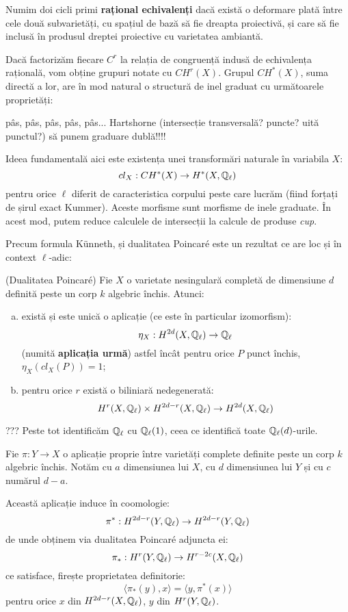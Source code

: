 \documentclass[13pt,openany]{book}
\begin{document}
Numim doi cicli primi {\bf rațional echivalenți} dacă există o deformare plată între cele două subvarietăți, cu spațiul de bază să fie dreapta proiectivă, și care să fie inclusă în produsul dreptei proiective cu varietatea ambiantă.

Dacă factorizăm fiecare $C^r$ la relația de congruență indusă de echivalența rațională, vom obține grupuri notate cu $CH^r(X)$. Grupul $CH^*(X)$, suma directă a lor, are în mod natural o structură de inel graduat cu următoarele proprietăți:

pâs, pâs, pâs, pâs, pâs... Hartshorne (intersecție transversală? puncte? uită punctul?) să punem graduare dublă!!!!

Ideea fundamentală aici este existența unei transformări naturale în variabila $X$:
$$cl_X : CH^*(X) \rightarrow H^*(X,\mathbb{Q}_\ell)$$
pentru orice $\ell$ diferit de caracteristica corpului peste care lucrăm (fiind forțați de șirul exact Kummer). Aceste morfisme sunt morfisme de inele graduate. În acest mod, putem reduce calculele de intersecții la calcule de produse {\it cup}.

Precum formula Künneth, și dualitatea Poincaré este un rezultat ce are loc și în context $\ell$-adic:

\begin{teo}
(Dualitatea Poincaré) Fie $X$ o varietate nesingulară completă de dimensiune $d$ definită peste un corp $k$ algebric închis. Atunci:
\begin{enumerate}[a)]
\item există și este unică o aplicație (ce este în particular izomorfism):
$$\eta_X : H^{2d}(X,\mathbb{Q}_\ell) \rightarrow \mathbb{Q}_\ell$$
(numită {\bf aplicația urmă}) astfel încât pentru orice $P$ punct închis, $\eta_X(cl_X(P))=1$;
\item pentru orice $r$ există o biliniară nedegenerată:
$$H^r(X,\mathbb{Q}_\ell) \times H^{2d-r}(X,\mathbb{Q}_\ell) \rightarrow H^{2d}(X,\mathbb{Q}_\ell)$$
\end{enumerate}
\end{teo}

??? Peste tot identificăm $\mathbb{Q}_\ell$ cu $\mathbb{Q}_\ell(1)$, ceea ce identifică toate $\mathbb{Q}_\ell(d)$-urile.

Fie $\pi : Y \rightarrow X$ o aplicație proprie între varietăți complete definite peste un corp $k$ algebric închis. Notăm cu $a$ dimensiunea lui $X$, cu $d$ dimensiunea lui $Y$ și cu $c$ numărul $d-a$.

Această aplicație induce în coomologie:
$$\pi^*: H^{2d-r}(Y,\mathbb{Q}_\ell) \rightarrow H^{2d-r}(Y,\mathbb{Q}_\ell)$$
de unde obținem via dualitatea Poincaré adjuncta ei:
$$\pi_* : H^r(Y,\mathbb{Q}_\ell) \rightarrow H^{r-2c}(X,\mathbb{Q}_\ell)$$
ce satisface, firește proprietatea definitorie:
$$\langle \pi_*(y),x \rangle=\langle y,\pi^*(x)\rangle$$
pentru orice $x$ din $H^{2d-r}(X,\mathbb{Q}_\ell)$, $y$ din $H^r(Y,\mathbb{Q}_\ell)$.
\end{document}
